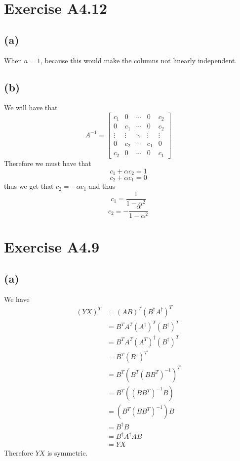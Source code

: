 \section*{Exercise A4.12}
\subsection*{(a)}
When $a=1$, because this would make the columns not linearly independent.
\subsection*{(b)}
We will have that 
$$A^{-1}=\begin{bmatrix}
    c_1 & 0 & \cdots & 0 & c_2\\
    0 & c_1 & \cdots & 0 & c_2\\
    \vdots & \vdots & \ddots & \vdots & \vdots\\
    0 & c_2 & \cdots & c_1 & 0\\
    c_2 & 0 & \cdots & 0 & c_1
\end{bmatrix}$$
Therefore we must have that 
$$c_1+\alpha c_2=1$$
$$c_2+\alpha c_1=0$$
thus we get that $c_2=-\alpha c_1$ and thus
$$c_1=\frac{1}{1-\alpha^2}$$
$$c_2=-\frac{\alpha}{1-\alpha^2}$$
\section*{Exercise A4.9}
\subsection*{(a)}
We have 
\begin{align*}
    (YX)^T&=\left(AB\right)^T\left(B^{\dagger}A^{\dagger}\right)^T\\
    &=B^TA^T\left(A^{\dagger}\right)^T\left(B^{\dagger}\right)^T\\
    &=B^TA^T\left(A^T\right)^{\dagger}\left(B^{\dagger}\right)^T\\
    &=B^T\left(B^{\dagger}\right)^T\\
    &=B^T\left(B^T(BB^T)^{-1}\right)^T\\
    &=B^T\left((BB^T)^{-1}B\right)\\
    &=\left(B^T(BB^T)^{-1}\right)B\\
    &=B^{\dagger}B\\
    &=B^{\dagger}A^{\dagger}AB\\
    &=YX
\end{align*}
Therefore $YX$ is symmetric.
